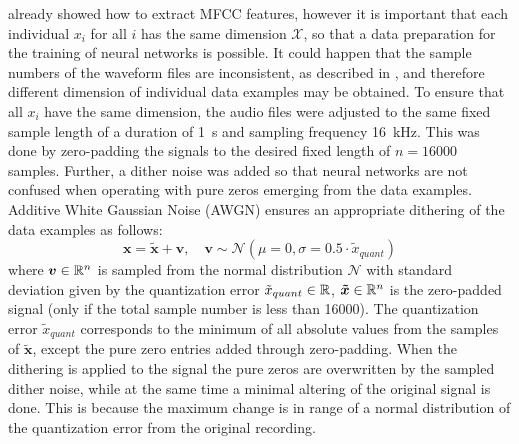  already showed how to extract MFCC features, however it is important that each individual $x_i$ for all $i$ has the same dimension $\mathcal{X}$, so that a data preparation for the training of neural networks is possible.
It could happen that the sample numbers of the waveform files are inconsistent, as described in , and therefore different dimension of individual data examples may be obtained.
To ensure that all $x_i$ have the same dimension, the audio files were adjusted to the same fixed sample length of a duration of \SI{1}{\second} and sampling frequency \SI{16}{\kilo\hertz}.
This was done by zero-padding the signals to the desired fixed length of $n = 16000$ samples.
Further, a dither noise was added so that neural networks are not confused when operating with pure zeros emerging from the data examples.
Additive White Gaussian Noise (AWGN) ensures an appropriate dithering of the data examples as follows:
\begin{equation}\label{eq:exp_dither}
  \bm{x} = \bm{\tilde{x}} + \bm{v}, \quad \bm{v} \sim \mathcal{N}(\mu=0, \sigma=0.5 \cdot \tilde{x}_{quant}) 
\end{equation}
where $\bm{v} \in \mathbb{R}^n$ is sampled from the normal distribution $\mathcal{N}$ with standard deviation given by the quantization error $\tilde{x}_{quant} \in \mathbb{R}$, $\bm{\tilde{x}} \in \mathbb{R}^n$ is the zero-padded signal (only if the total sample number is less than 16000).
The quantization error $\tilde{x}_{quant}$ corresponds to the minimum of all absolute values from the samples of $\bm{\tilde{x}}$, except the pure zero entries added through zero-padding.
When the dithering is applied to the signal the pure zeros are overwritten by the sampled dither noise, while at the same time a minimal altering of the original signal is done.
This is because the maximum change is in range of a normal distribution of the quantization error from the original recording.